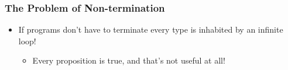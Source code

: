 \documentclass{beamer}
\begin{document}
\begin{frame}
  \frametitle{The Problem of Non-termination}
  \begin{itemize}
  \item If programs don't have to terminate every type is inhabited by an infinite loop!
  \begin{itemize} \item \alert{Every proposition is true, and that's not useful at all!} \end{itemize}
  \end{itemize}
\end{frame}
\end{document}
